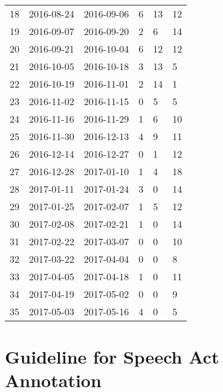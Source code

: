 \begin{table}[h]
{\begin{tabular}{@{}llllll@{}}
			18     & 2016-08-24 & 2016-09-06 & 6            & 13                 & 12       \\
			19     & 2016-09-07 & 2016-09-20 & 2            & 6                  & 14       \\
			20     & 2016-09-21 & 2016-10-04 & 6            & 12                 & 12       \\
			21     & 2016-10-05 & 2016-10-18 & 3            & 13                 & 5        \\
			22     & 2016-10-19 & 2016-11-01 & 2            & 14                 & 1        \\
			23     & 2016-11-02 & 2016-11-15 & 0            & 5                  & 5        \\
			24     & 2016-11-16 & 2016-11-29 & 1            & 6                  & 10       \\
			25     & 2016-11-30 & 2016-12-13 & 4            & 9                  & 11       \\
			26     & 2016-12-14 & 2016-12-27 & 0            & 1                  & 12       \\
			27     & 2016-12-28 & 2017-01-10 & 1            & 4                  & 18       \\
			28     & 2017-01-11 & 2017-01-24 & 3            & 0                  & 14       \\
			29     & 2017-01-25 & 2017-02-07 & 1            & 5                  & 12       \\
			30     & 2017-02-08 & 2017-02-21 & 1            & 0                  & 14       \\
			31     & 2017-02-22 & 2017-03-07 & 0            & 0                  & 10       \\
			32     & 2017-03-22 & 2017-04-04 & 0            & 0                  & 8        \\
			33     & 2017-04-05 & 2017-04-18 & 1            & 0                  & 11       \\
			34     & 2017-04-19 & 2017-05-02 & 0            & 0                  & 9        \\
			35     & 2017-05-03 & 2017-05-16 & 4            & 0                  & 5        \\ \bottomrule
		\end{tabular}%
	}
\end{table}


\section{Guideline for Speech Act Annotation}
\label{sec:sa-guideline}

